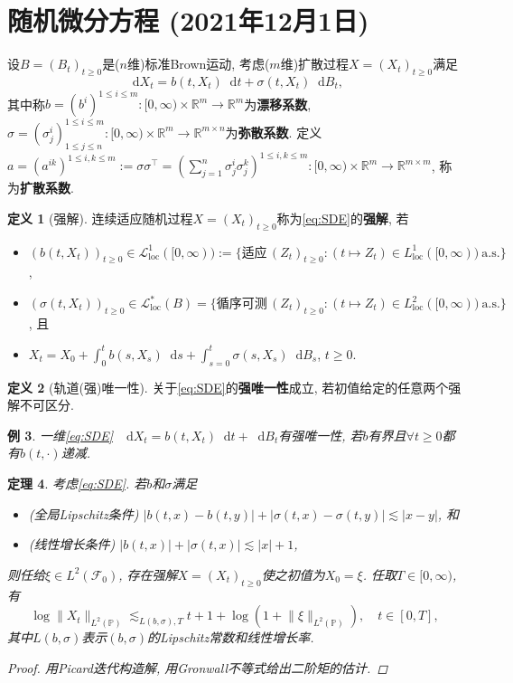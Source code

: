 \documentclass{ctexart}
\theoremstyle{definition}
\newtheorem{Def}{定义}[section]
\theoremstyle{remark}
\theoremstyle{plain}
\newtheorem{Thm}[Def]{定理}
\newtheorem{Eg}[Def]{例}
\newcommand{\1}{\mathbbm{1}}				%
\newcommand{\as}{\mathrm{a.s.}}				%
\renewcommand{\P}{\mathbb{P}}				%
\newcommand{\abs}[1]{\lvert#1\rvert}			%
\newcommand{\norm}[1]{\lVert#1\rVert}
\newcommand{\R}{\mathbb{R}}					%
\renewcommand*{\d}{\mathop{}\!\mathrm{d}}	%
\begin{document}
\section{随机微分方程 \normalfont\footnotesize (2021年12月1日)}
设$B = (B_{t})_{t \ge 0}$是($n$维)标准Brown运动, 考虑($m$维)扩散过程$X = (X_{t})_{t \ge 0}$满足
\[ \d X_{t} = b(t,X_{t}) \d t + \sigma(t,X_{t}) \d B_{t} , \label{eq:SDE}\tag{SDE}\]
其中称$b = (b^{i})^{1\le i\le m} : [0,\infty)\times\R^{m} \to \R^{m}$为\textbf{漂移系数}, $\sigma = (\sigma^{i}_{j})^{1\le i\le m}_{1\le j\le n} : [0,\infty)\times\R^{m} \to \R^{m\times n}$为\textbf{弥散系数}.
定义$a = (a^{ik})^{1 \le i,k \le m} := \sigma\sigma^{\top} = (\sum_{j=1}^{n} \sigma^{i}_{j}\sigma^{k}_{j})^{1 \le i,k \le m} : [0,\infty)\times\R^{m} \to \R^{m\times m}$, 称为\textbf{扩散系数}.

\begin{Def}[强解]
连续适应随机过程$X = (X_{t})_{t \ge 0}$称为\eqref{eq:SDE}的\textbf{强解}, 若
\begin{itemize}
	\item $(b(t,X_{t}))_{t \ge 0} \in \mathcal{L}^{1}_{\mathrm{loc}}([0,\infty)) := \{ \text{适应}\,(Z_{t})_{t \ge 0} : (t \mapsto Z_{t}) \in L^{1}_{\mathrm{loc}}([0,\infty)) ~\as \}$, 
	\item $(\sigma(t,X_{t}))_{t \ge 0} \in \mathcal{L}_{\mathrm{loc}}^{*}(B) = \{ \text{循序可测}\,(Z_{t})_{t \ge 0} : (t \mapsto Z_{t}) \in L^{2}_{\mathrm{loc}}([0,\infty)) ~\as \}$, 且
	\item $X_{t} = X_{0} + \int_{0}^{t} b(s,X_{s}) \d s + \int_{s=0}^{t} \sigma(s,X_{s}) \d B_{s}$, $t \ge 0$.
\end{itemize}
\end{Def}
\begin{Def}[轨道(强)唯一性]
关于\eqref{eq:SDE}的\textbf{强唯一性}成立, 若初值给定的任意两个强解不可区分.
\end{Def}

\begin{Eg}
一维\ref{eq:SDE}~$\d X_{t} = b(t,X_{t}) \d t + \d B_{t}$有强唯一性, 若$b$有界且$\forall t \ge 0$都有$b(t,\bm{\cdot})$递减.
\end{Eg}

\begin{Thm}
考虑\eqref{eq:SDE}. 若$b$和$\sigma$满足
\begin{itemize}
	\item (全局Lipschitz条件) $\abs{b(t,x)-b(t,y)}+\abs{\sigma(t,x)-\sigma(t,y)} \lesssim \abs{x-y}$, 和
	\item (线性增长条件) $\abs{b(t,x)}+\abs{\sigma(t,x)} \lesssim \abs{x} + 1$, 
\end{itemize}
则任给$\xi \in L^{2}(\mathscr{F}_{0})$, 存在强解$X = (X_{t})_{t \ge 0}$使之初值为$X_{0} = \xi$. 任取$T \in [0,\infty)$, 有
\[ \log \norm{X_{t}}_{L^{2}(\P)} \lesssim_{L(b,\sigma),T} t + 1 + \log(1+\norm{\xi}_{L^{2}(\P)}) ,\quad t \in [0,T] , \]
其中$L(b,\sigma)$表示$(b,\sigma)$的Lipschitz常数和线性增长率.
\begin{proof}
用Picard迭代构造解, 用Gronwall不等式给出二阶矩的估计.
\end{proof}
\end{Thm}
\end{document}

